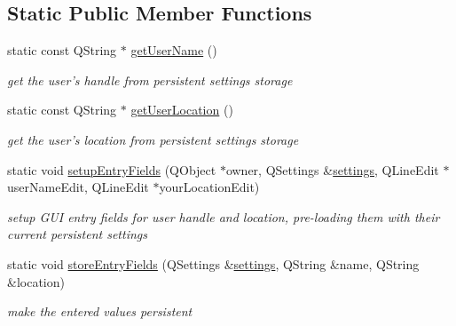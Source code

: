 \subsection*{Static Public Member Functions}
\begin{CompactItemize}
\item 
\hypertarget{classSettingsDialog_17a7fc8b62855c45e9c52be98956a85e}{
static const QString $\ast$ \hyperlink{classSettingsDialog_17a7fc8b62855c45e9c52be98956a85e}{getUserName} ()}
\label{classSettingsDialog_17a7fc8b62855c45e9c52be98956a85e}

\begin{CompactList}\small\item\em get the user's handle from persistent settings storage \item\end{CompactList}\item 
\hypertarget{classSettingsDialog_4bb2e89baab333e89a21b59cdb2adaf5}{
static const QString $\ast$ \hyperlink{classSettingsDialog_4bb2e89baab333e89a21b59cdb2adaf5}{getUserLocation} ()}
\label{classSettingsDialog_4bb2e89baab333e89a21b59cdb2adaf5}

\begin{CompactList}\small\item\em get the user's location from persistent settings storage \item\end{CompactList}\item 
\hypertarget{classSettingsDialog_b7fc0a40ba7726d41eb217e4ea0dbff0}{
static void \hyperlink{classSettingsDialog_b7fc0a40ba7726d41eb217e4ea0dbff0}{setupEntryFields} (QObject $\ast$owner, QSettings \&\hyperlink{classSettingsDialog_22a1b1607d5bf39067836cd7efc06270}{settings}, QLineEdit $\ast$userNameEdit, QLineEdit $\ast$yourLocationEdit)}
\label{classSettingsDialog_b7fc0a40ba7726d41eb217e4ea0dbff0}

\begin{CompactList}\small\item\em setup GUI entry fields for user handle and location, pre-loading them with their current persistent settings \item\end{CompactList}\item 
\hypertarget{classSettingsDialog_501874ae3971a9682a111ee8590883e2}{
static void \hyperlink{classSettingsDialog_501874ae3971a9682a111ee8590883e2}{storeEntryFields} (QSettings \&\hyperlink{classSettingsDialog_22a1b1607d5bf39067836cd7efc06270}{settings}, QString \&name, QString \&location)}
\label{classSettingsDialog_501874ae3971a9682a111ee8590883e2}

\begin{CompactList}\small\item\em make the entered values persistent \item\end{CompactList}\end{CompactItemize}
